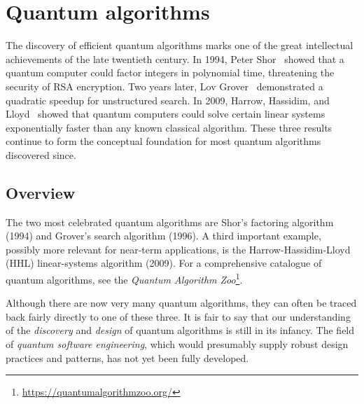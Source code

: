 
\section{Quantum algorithms}\label{sec:algorithms}

\begin{historical}
  The discovery of efficient quantum algorithms marks one of the great
  intellectual achievements of the late twentieth century.  In 1994, Peter
  Shor~\cite{Shor1994} showed that a quantum computer could factor integers
  in polynomial time, threatening the security of RSA encryption.  Two years
  later, Lov Grover~\cite{Grover1996} demonstrated a quadratic speedup for
  unstructured search.  In 2009, Harrow, Hassidim, and
  Lloyd~\cite{HHL2009} showed that quantum computers could solve certain
  linear systems exponentially faster than any known classical algorithm.
  These three results continue to form the conceptual foundation for most
  quantum algorithms discovered since.
\end{historical}

\subsection{Overview}\label{subsec:algo-overview}

The two most celebrated quantum algorithms are Shor's factoring algorithm
(1994) and Grover's search algorithm (1996).  A third important example,
possibly more relevant for near-term applications, is the
Harrow-Hassidim-Lloyd (HHL) linear-systems algorithm (2009).  For a
comprehensive catalogue of quantum algorithms, see the
\emph{Quantum Algorithm Zoo}\footnote{\url{https://quantumalgorithmzoo.org/}}.

Although there are now very many quantum algorithms, they can often be traced
back fairly directly to one of these three.  It is fair to say that our
understanding of the \emph{discovery} and \emph{design} of quantum
algorithms is still in its infancy.  The field of \emph{quantum software
  engineering}, which would presumably supply robust design practices and
patterns, has not yet been fully developed.

